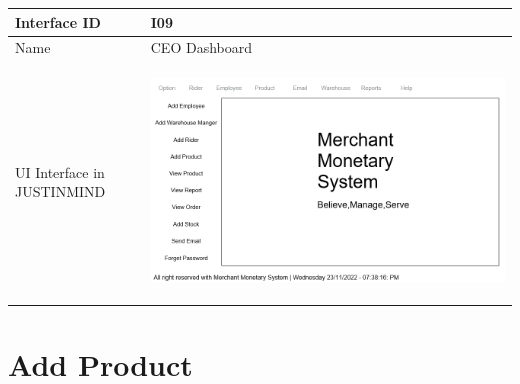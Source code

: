 \documentclass[12pt,a4paper]{report}
\begin{document}
\begin{tabular}{ | m{3cm} | m{12cm}| } \hline

Interface ID &  I09 \\\hline

Name  	      & CEO Dashboard  \\ \hline

UI Interface in JUSTINMIND & \begin{center} \includegraphics[scale=0.3]{./User Interface/UI-007 CEO Dashboard@1x.png}\end{center}  \\ \hline

\end{tabular} 
\section{Add Product }
\end{document}

